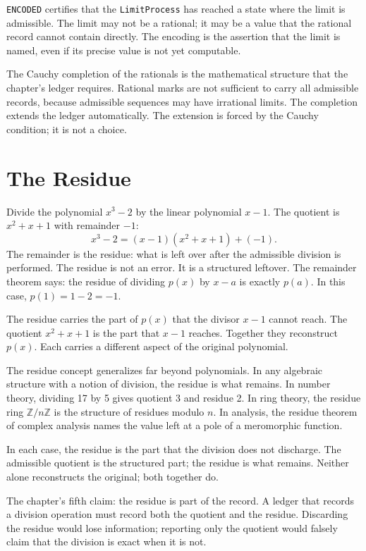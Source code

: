 \texttt{ENCODED} certifies that the \texttt{LimitProcess} has reached a
state where the limit is admissible. The limit may not be a rational; it
may be a value that the rational record cannot contain directly. The
encoding is the assertion that the limit is named, even if its precise
value is not yet computable.

The Cauchy completion of the rationals is the mathematical structure
that the chapter's ledger requires. Rational marks are not sufficient
to carry all admissible records, because admissible sequences may have
irrational limits. The completion extends the ledger automatically. The
extension is forced by the Cauchy condition; it is not a choice.

\section{The Residue}
\label{se:the-residue}

Divide the polynomial $x^3 - 2$ by the linear polynomial $x - 1$. The
quotient is $x^2 + x + 1$ with remainder $-1$:
\[
x^3 - 2 = (x - 1)(x^2 + x + 1) + (-1).
\]
The remainder is the residue: what is left over after the admissible
division is performed. The residue is not an error. It is a structured
leftover. The remainder theorem says: the residue of dividing $p(x)$ by
$x - a$ is exactly $p(a)$. In this case, $p(1) = 1 - 2 = -1$.

The residue carries the part of $p(x)$ that the divisor $x - 1$ cannot
reach. The quotient $x^2 + x + 1$ is the part that $x - 1$ reaches.
Together they reconstruct $p(x)$. Each carries a different aspect of
the original polynomial.

The residue concept generalizes far beyond polynomials. In any
algebraic structure with a notion of division, the residue is what
remains. In number theory, dividing 17 by 5 gives quotient 3 and
residue 2. In ring theory, the residue ring $\mathbb{Z}/n\mathbb{Z}$
is the structure of residues modulo $n$. In analysis, the residue
theorem of complex analysis names the value left at a pole of a
meromorphic function.

In each case, the residue is the part that the division does not
discharge. The admissible quotient is the structured part; the
residue is what remains. Neither alone reconstructs the original; both
together do.

The chapter's fifth claim: the residue is part of the record. A
ledger that records a division operation must record both the
quotient and the residue. Discarding the residue would lose
information; reporting only the quotient would falsely claim
that the division is exact when it is not.

